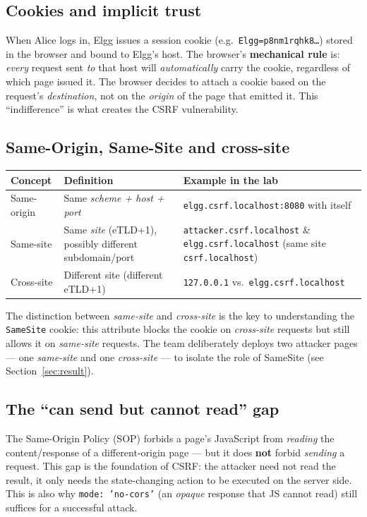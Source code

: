 \documentclass[11pt,a4paper]{article}
\begin{document}
\subsection{Cookies and implicit trust}
When Alice logs in, Elgg issues a session cookie (e.g.\ \texttt{Elgg=p8nm1rqhk8\ldots}) stored in the browser and bound to Elgg's host. The browser's \textbf{mechanical rule} is: \emph{every} request sent \emph{to} that host will \emph{automatically} carry the cookie, regardless of which page issued it. The browser decides to attach a cookie based on the request's \emph{destination}, not on the \emph{origin} of the page that emitted it. This ``indifference'' is what creates the CSRF vulnerability.

\subsection{Same-Origin, Same-Site and cross-site}
\begin{center}\small
\begin{tabularx}{\linewidth}{@{}l Y Y@{}}
\toprule
\textbf{Concept} & \textbf{Definition} & \textbf{Example in the lab}\\
\midrule
Same-origin & Same \emph{scheme + host + port} & \texttt{elgg.csrf.localhost:8080} with itself\\
Same-site & Same \emph{site} (eTLD+1), possibly different subdomain/port & \texttt{attacker.csrf.localhost} \& \texttt{elgg.csrf.localhost} (same site \texttt{csrf.localhost})\\
Cross-site & Different site (different eTLD+1) & \texttt{127.0.0.1} vs.\ \texttt{elgg.csrf.localhost}\\
\bottomrule
\end{tabularx}
\end{center}
\noindent The distinction between \emph{same-site} and \emph{cross-site} is the key to understanding the \texttt{SameSite} cookie: this attribute blocks the cookie on \emph{cross-site} requests but still allows it on \emph{same-site} requests. The team deliberately deploys two attacker pages — one \emph{same-site} and one \emph{cross-site} — to isolate the role of SameSite (see Section~\ref{sec:result}).

\subsection{The ``can send but cannot read'' gap}
The Same-Origin Policy (SOP) forbids a page's JavaScript from \emph{reading} the content/response of a different-origin page — but it does \textbf{not} forbid \emph{sending} a request. This gap is the foundation of CSRF: the attacker need not read the result, it only needs the state-changing action to be executed on the server side. This is also why \texttt{mode: 'no-cors'} (an \emph{opaque} response that JS cannot read) still suffices for a successful attack.
\end{document}
